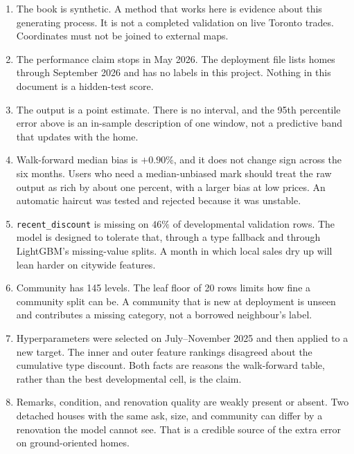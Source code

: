 \documentclass[11pt]{article}
\begin{document}
\begin{enumerate}
\item The book is synthetic. A method that works here is evidence about this generating process. It is not a completed validation on live Toronto trades. Coordinates must not be joined to external maps.

\item The performance claim stops in May 2026. The deployment file lists homes through September 2026 and has no labels in this project. Nothing in this document is a hidden-test score.

\item The output is a point estimate. There is no interval, and the 95th percentile error above is an in-sample description of one window, not a predictive band that updates with the home.

\item Walk-forward median bias is \(+0.90\%\), and it does not change sign across the six months. Users who need a median-unbiased mark should treat the raw output as rich by about one percent, with a larger bias at low prices. An automatic haircut was tested and rejected because it was unstable.

\item \texttt{recent\_discount} is missing on \(46\%\) of developmental validation rows. The model is designed to tolerate that, through a type fallback and through LightGBM's missing-value splits. A month in which local sales dry up will lean harder on citywide features.

\item Community has 145 levels. The leaf floor of 20 rows limits how fine a community split can be. A community that is new at deployment is unseen and contributes a missing category, not a borrowed neighbour's label.

\item Hyperparameters were selected on July--November 2025 and then applied to a new target. The inner and outer feature rankings disagreed about the cumulative type discount. Both facts are reasons the walk-forward table, rather than the best developmental cell, is the claim.

\item Remarks, condition, and renovation quality are weakly present or absent. Two detached houses with the same ask, size, and community can differ by a renovation the model cannot see. That is a credible source of the extra error on ground-oriented homes.


\end{enumerate}
\end{document}
